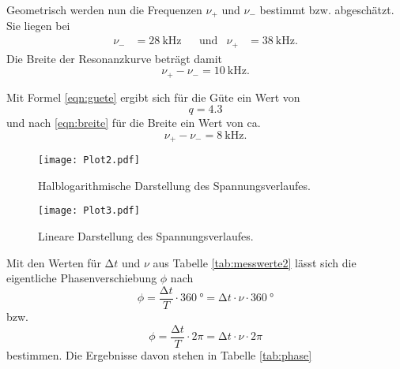 \documentclass[
  bibliography=totoc,     %
  captions=tableheading,  %
  titlepage=firstiscover, %
]{scrartcl}
\begin{document}
Geometrisch werden nun die Frequenzen $\nu_+$ und $\nu_-$ bestimmt bzw. abgeschätzt.
Sie liegen bei
\begin{align}
  \nu_- &= \SI{28}{\kilo\hertz} & &\text{und} & \nu_+ &= \SI{38}{\kilo\hertz}.
\end{align}
Die Breite der Resonanzkurve beträgt damit
\begin{equation}
  \nu_+ - \nu_- = \SI{10}{\kilo\hertz}.
\end{equation}

Mit Formel \eqref{eqn:guete} ergibt sich für die Güte ein Wert von
\begin{equation}
  q = 4.3
\end{equation}
und nach \eqref{eqn:breite} für die Breite ein Wert von ca.
\begin{equation}
  \nu_+ - \nu_- = \SI{8}{\kilo\hertz}.
\end{equation}
\begin{figure}[htb]
  \centering
  \texttt{[image: Plot2.pdf]}
  \caption{Halblogarithmische Darstellung des Spannungsverlaufes.}
  \label{fig:plot2}
\end{figure}
\begin{figure}[htb]
  \centering
  \texttt{[image: Plot3.pdf]}
  \caption{Lineare Darstellung des Spannungsverlaufes.}
  \label{fig:plot3}
\end{figure}
\clearpage
Mit den Werten für $\increment t$ und $\nu$ aus Tabelle \ref{tab:messwerte2}
lässt sich die eigentliche Phasenverschiebung $\phi$ nach
\begin{equation}
  \phi = \frac{\increment t}{T} \cdot \SI{360}{\degree} = \increment t \cdot \nu \cdot \SI{360}{\degree}
\end{equation}
bzw.
\begin{equation}
  \phi = \frac{\increment t}{T} \cdot 2\pi = \increment t \cdot \nu \cdot 2\pi
\end{equation}
bestimmen. Die Ergebnisse davon stehen in Tabelle \ref{tab:phase}
\end{document}
